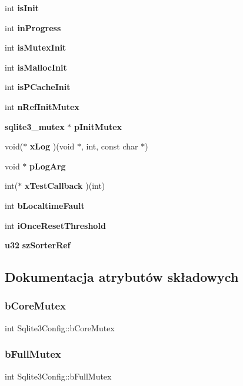 \begin{DoxyCompactItemize}
\item 
int \textbf{ is\+Init}
\item 
int \textbf{ in\+Progress}
\item 
int \textbf{ is\+Mutex\+Init}
\item 
int \textbf{ is\+Malloc\+Init}
\item 
int \textbf{ is\+P\+Cache\+Init}
\item 
int \textbf{ n\+Ref\+Init\+Mutex}
\item 
\textbf{ sqlite3\+\_\+mutex} $\ast$ \textbf{ p\+Init\+Mutex}
\item 
void($\ast$ \textbf{ x\+Log} )(void $\ast$, int, const char $\ast$)
\item 
void $\ast$ \textbf{ p\+Log\+Arg}
\item 
int($\ast$ \textbf{ x\+Test\+Callback} )(int)
\item 
int \textbf{ b\+Localtime\+Fault}
\item 
int \textbf{ i\+Once\+Reset\+Threshold}
\item 
\textbf{ u32} \textbf{ sz\+Sorter\+Ref}
\end{DoxyCompactItemize}


\subsection{Dokumentacja atrybutów składowych}
\mbox{\label{struct_sqlite3_config_a202216a82e0823d0a4629c4884215a54}} 
\subsubsection{bCoreMutex}
{\footnotesize\ttfamily int Sqlite3\+Config\+::b\+Core\+Mutex}

\mbox{\label{struct_sqlite3_config_aab880bf54370cd0f6210afce0fb646ee}} 
\subsubsection{bFullMutex}
{\footnotesize\ttfamily int Sqlite3\+Config\+::b\+Full\+Mutex}

\mbox{\label{struct_sqlite3_config_a7bdc3109ecd839317f722b5da5339fab}} 
